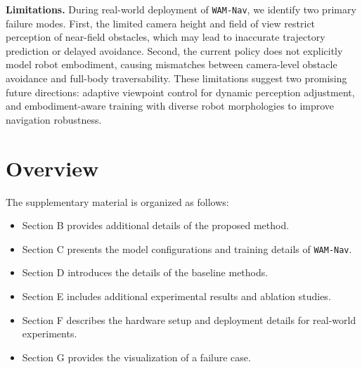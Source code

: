 \documentclass{article}
\begin{document}
\textbf{Limitations.}
During real-world deployment of \texttt{WAM-Nav}, we identify two primary failure modes. First, the limited camera height and field of view restrict perception of near-field obstacles, which may lead to inaccurate trajectory prediction or delayed avoidance. Second, the current policy does not explicitly model robot embodiment, causing mismatches between camera-level obstacle avoidance and full-body traversability. These limitations suggest two promising future directions: adaptive viewpoint control for dynamic perception adjustment, and embodiment-aware training with diverse robot morphologies to improve navigation robustness.

\clearpage



\newpage
\appendix
\section{Overview}

The supplementary material is organized as follows:
\begin{itemize}
    \item Section B provides additional details of the proposed method.
    \item Section C presents the model configurations and training details of \texttt{WAM-Nav}.
    \item Section D introduces the details of the baseline methods.
    \item Section E includes additional experimental results and ablation studies.
    \item Section F describes the hardware setup and deployment details for real-world experiments.
    \item Section G provides the visualization of a failure case.
\end{itemize}
\end{document}

